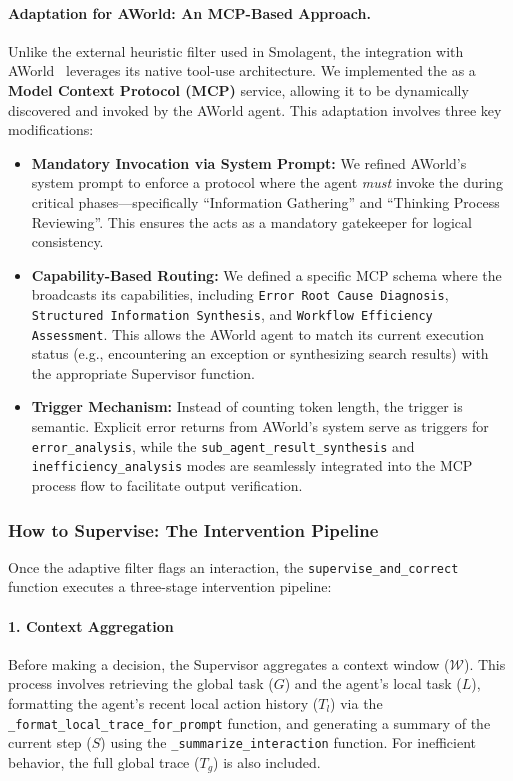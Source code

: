 \paragraph{Adaptation for AWorld: An MCP-Based Approach.}
Unlike the external heuristic filter used in Smolagent, the integration with AWorld~\citep{yu2025aworldorchestratingtrainingrecipe} leverages its native tool-use architecture. We implemented the \method as a \textbf{Model Context Protocol (MCP)} service, allowing it to be dynamically discovered and invoked by the AWorld agent. This adaptation involves three key modifications:
\begin{itemize}[nosep, leftmargin=12pt]
    \item \textbf{Mandatory Invocation via System Prompt:} We refined AWorld's system prompt to enforce a protocol where the agent \textit{must} invoke the \method during critical phases—specifically ``Information Gathering'' and ``Thinking Process Reviewing''. This ensures the \method acts as a mandatory gatekeeper for logical consistency.
    \item \textbf{Capability-Based Routing:} We defined a specific MCP schema where the \method broadcasts its capabilities, including \texttt{Error Root Cause Diagnosis}, \texttt{Structured Information Synthesis}, and \texttt{Workflow Efficiency Assessment}. This allows the AWorld agent to match its current execution status (e.g., encountering an exception or synthesizing search results) with the appropriate Supervisor function.
    \item \textbf{Trigger Mechanism:} Instead of counting token length, the trigger is semantic. Explicit error returns from AWorld's system serve as triggers for \texttt{error\_analysis}, while the \texttt{sub\_agent\_result\_synthesis} and \texttt{inefficiency\_analysis} modes are seamlessly integrated into the MCP process flow to facilitate output verification.
\end{itemize}



\subsubsection{How to Supervise: The Intervention Pipeline}
Once the adaptive filter flags an interaction, the \texttt{supervise\_and\_correct} function executes a three-stage intervention pipeline:

\paragraph{1. Context Aggregation}
Before making a decision, the Supervisor aggregates a context window ($\mathcal{W}$). This process involves retrieving the global task ($G$) and the agent's local task ($L$), formatting the agent's recent local action history ($T_l$) via the \texttt{\_format\_local\_trace\_for\_prompt} function, and generating a summary of the current step ($S$) using the \texttt{\_summarize\_interaction} function. For inefficient behavior, the full global trace ($T_g$) is also included.

